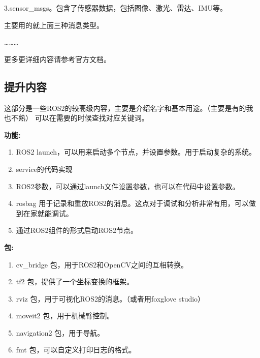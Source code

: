 3.sensor\_msgs。包含了传感器数据，包括图像、激光、雷达、IMU等。

主要用的就上面三种消息类型。

\dots \dots \dots

更多更详细内容请参考官方文档。

\subsection{提升内容}
这部分是一些ROS2的较高级内容，主要是介绍名字和基本用途。（主要是有的我也不熟）
可以在需要的时候查找对应关键词。

\textbf{功能:}
\begin{enumerate}
    \item ROS2 launch，可以用来启动多个节点，并设置参数。用于启动复杂的系统。
    \item service的代码实现
    \item ROS2参数，可以通过launch文件设置参数，也可以在代码中设置参数。
    \item rosbag 用于记录和重放ROS2的消息。这点对于调试和分析非常有用，可以做到在家就能调试。
    \item 通过ROS2组件的形式启动ROS2节点。
\end{enumerate}

\textbf{包:}
\begin{enumerate}
    \item cv\_bridge 包，用于ROS2和OpenCV之间的互相转换。
    \item tf2 包，提供了一个坐标变换的框架。
    \item rviz 包，用于可视化ROS2的消息。（或者用foxglove studio）
    \item moveit2 包，用于机械臂控制。
    \item navigation2 包，用于导航。
    \item fmt 包，可以自定义打印日志的格式。
\end{enumerate}